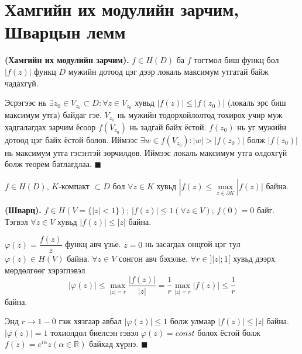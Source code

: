 \section{Хамгийн их модулийн зарчим,
Шварцын лемм } 
\begin{thm}
\textbf{(Хамгийн их модулийн зарчим).}  $f\in H(D)$ ба $f$ тогтмол биш функц бол $|f(z)|$ функц $D$ мужийн дотоод цэг дээр локаль максимум утгатай байж чадахгүй.
\end{thm}
\begin{prf}
Эсрэгээс нь $\exists z_0\in V_{z_0}\subset D:\forall z\in V_{z_0}$ хувьд $|f(z)|\leq |f(z_0)|$ (локаль эрс биш максимум утга) байдаг гэе. $V_{z_0}$ нь мужийн тодорхойлолтод тохирох учир муж хадгалагдах зарчим ёсоор $f(V_{z_0})$ нь задгай байх ёстой. $f(z_0)$ нь уг мужийн дотоод цэг байх ёстой болов. Иймээс
$\exists w\in f(V_{z_0}):|w|>|f(z_0)|$ болж $|f(z_0)|$ нь максимум утга гэсэнтэй зөрчилдөв. Иймээс локаль максимум утга олдохгүй болж теорем батлагдлаа. 
\hfill $\blacksquare$\end{prf}
\begin{cor}
$f\in H(D)$, $K$-компакт $\subset D$ бол $\forall z\in K$ хувьд  $|f(z)\leq \max\limits_{z\in \partial K}|f(z)|$ байна.
\end{cor}
\begin{lem}
\textbf{(Шварц).}  $f\in H(V=\{|z|<1\})$; $|f(z)|\leq 1(\forall z\in V)$; $f(0)=0$ байг. Тэгвэл $\forall z\in V$ хувьд $|f(z)|\leq |z|$ байна. 
\end{lem}
\begin{prf}
$\varphi (z)=\dfrac{f(z)}{z}$ функц авч үзье. $z=0$ нь засагдах онцгой цэг 
тул  $\varphi(z)\in H(V)$ байна. $\forall z\in V$ сонгон авч бэхэлье. $\forall r\in ]|z|;1[$ хувьд дээрх мөрдөлгөөг хэрэглэвэл
$$|\varphi (z)|\leq \max\limits_{|z|=r}\frac{|f(z)|}{|z|}=\frac{1}{r}\max\limits_{|z|=r}|f(z)|\leq \frac{1}{r}$$ байна.

Энд $r\rightarrow 1-0$ гэж хязгаар авбал $|\varphi(z)|\leq 1$ болж улмаар $|f(z)|\leq |z|$ байна. $|\varphi (z)|=1$ тохиолдол биелсэн гэвэл  $\varphi (z)=const$ болох ёстой болж $f(z)=e^{i\alpha}z (\alpha \in\mathbb{R})$ байхад хүрнэ.
\hfill $\blacksquare$\end{prf}
